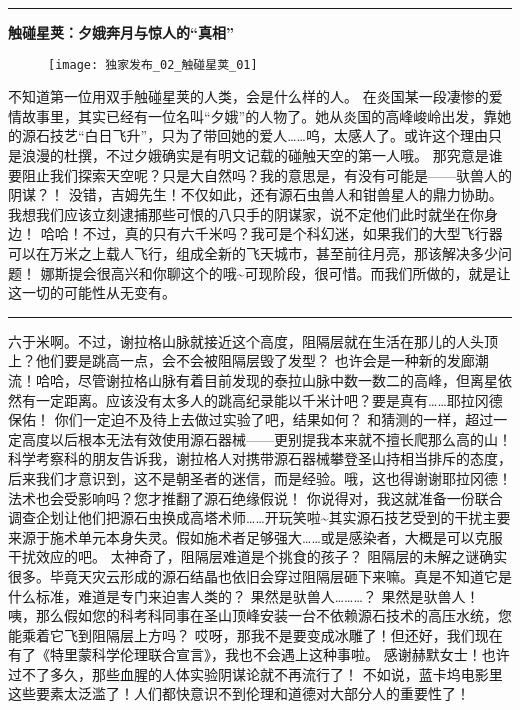\documentclass[openany]{book}
\begin{document}
\par\noindent\rule{\textwidth}{0.4pt}
\begin{center} \textbf{触碰星荚：夕娥奔月与惊人的“真相”}\end{center}
\begin{figure}[h]
    \centering
    \texttt{[image: 独家发布\_02\_触碰星荚\_01]}
\end{figure}
\begin{dialogue}
     不知道第一位用双手触碰星荚的人类，会是什么样的人。
     在炎国某一段凄惨的爱情故事里，其实已经有一位名叫“夕娥”的人物了。她从炎国的高峰峻岭出发，靠她的源石技艺“白日飞升”，只为了带回她的爱人……呜，太感人了。或许这个理由只是浪漫的杜撰，不过夕娥确实是有明文记载的碰触天空的第一人哦。
     那究意是谁要阻止我们探索天空呢？只是大自然吗？我的意思是，有没有可能是——驮兽人的阴谋？！
     没错，吉姆先生！不仅如此，还有源石虫兽人和钳兽星人的鼎力协助。我想我们应该立刻逮捕那些可恨的八只手的阴谋家，说不定他们此时就坐在你身边！
     哈哈！不过，真的只有六千米吗？我可是个科幻迷，如果我们的大型飞行器可以在万米之上载人飞行，组成全新的飞天城市，甚至前往月亮，那该解决多少问题！
     娜斯提会很高兴和你聊这个的哦\sim 可现阶段，很可惜。而我们所做的，就是让这一切的可能性从无变有。
    \par\noindent\rule{\textwidth}{0.4pt}
     六于米啊。不过，谢拉格山脉就接近这个高度，阻隔层就在生活在那儿的人头顶上？他们要是跳高一点，会不会被阻隔层毁了发型？
     也许会是一种新的发廊潮流！哈哈，尽管谢拉格山脉有着目前发现的泰拉山脉中数一数二的高峰，但离星依然有一定距离。应该没有太多人的跳高纪录能以千米计吧？要是真有……耶拉冈德保佑！
     你们一定迫不及待上去做过实验了吧，结果如何？
     和猜测的一样，超过一定高度以后根本无法有效使用源石器械——更别提我本来就不擅长爬那么高的山！科学考察科的朋友告诉我，谢拉格人对携带源石器械攀登圣山持相当排斥的态度，后来我们才意识到，这不是朝圣者的迷信，而是经验。哦，这也得谢谢耶拉冈德！
     法术也会受影响吗？您才推翻了源石绝缘假说！
     你说得对，我这就准备一份联合调查企划让他们把源石虫换成高塔术师……开玩笑啦\sim 其实源石技艺受到的干扰主要来源于施术单元本身失灵。假如施术者足够强大……或是感染者，大概是可以克服干扰效应的吧。
     太神奇了，阻隔层难道是个挑食的孩子？
     阻隔层的未解之谜确实很多。毕竟天灾云形成的源石结晶也依旧会穿过阻隔层砸下来嘛。真是不知道它是什么标准，难道是专门来迫害人类的？
     果然是驮兽人………？
     果然是驮兽人！
     咦，那么假如您的科考科同事在圣山顶峰安装一台不依赖源石技术的高压水统，您能乘着它飞到阻隔层上方吗？
     哎呀，那我不是要变成冰雕了！但还好，我们现在有了《特里蒙科学伦理联合宣言》，我也不会遇上这种事啦。
     感谢赫默女士！也许过不了多久，那些血腥的人体实验阴谋论就不再流行了！
     不如说，蓝卡坞电影里这些要素太泛滥了！人们都快意识不到伦理和道德对大部分人的重要性了！
\end{dialogue}
\end{document}
